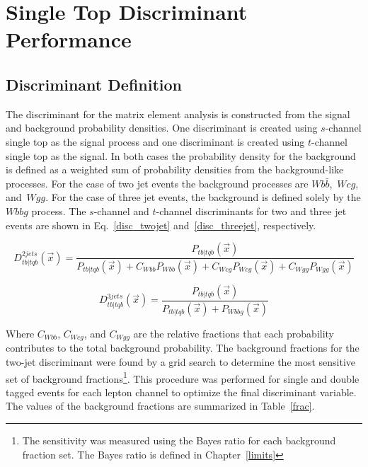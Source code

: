 \section{Single Top Discriminant Performance}
\label{perform}

\subsection{Discriminant Definition}
\label{disc-def}

The discriminant for the matrix element analysis is constructed from the signal and background probability densities. One discriminant is created using $s$-channel single top as the signal process and one discriminant is created using $t$-channel single top as the signal. In both cases the probability density for the background is defined as a weighted sum of probability densities from the background-like processes. For the case of two jet events the background processes are $Wb\bar{b}$,~$Wcg$, and~$Wgg$. For the case of three jet events, the background is defined solely by the $Wbbg$ process. The $s$-channel and $t$-channel discriminants for two and three jet events are shown in Eq.~\ref{disc_twojet} and~\ref{disc_threejet}, respectively.

\begin{equation}
\label{disc_twojet}
D^{2jets}_{tb|tqb}(\vec{x}) = \frac{P_{tb|tqb}(\vec{x})}{P_{tb|tqb}(\vec{x}) + C_{Wbb}P_{Wbb}(\vec{x}) + C_{Wcg}P_{Wcg}(\vec{x}) + C_{Wgg}P_{Wgg}(\vec{x})}
\end{equation}

\begin{equation}
\label{disc_threejet}
D^{3jets}_{tb|tqb}(\vec{x}) = \frac{P_{tb|tqb}(\vec{x})}{P_{tb|tqb}(\vec{x}) + P_{Wbbg}(\vec{x})}
\end{equation}

\noindent Where $C_{Wbb}$, $C_{Wcg}$, and $C_{Wgg}$ are the relative fractions that each probability contributes to the total background probability. The background fractions for the two-jet discriminant were found by a grid search to determine the most sensitive set of background fractions\footnote{The sensitivity was measured using the Bayes ratio for each background fraction set. The Bayes ratio is defined in Chapter~\ref{limits}}. This procedure was performed for single and double tagged events for each lepton channel to optimize the final discriminant variable. The values of the background fractions are summarized in Table~\ref{frac}.

